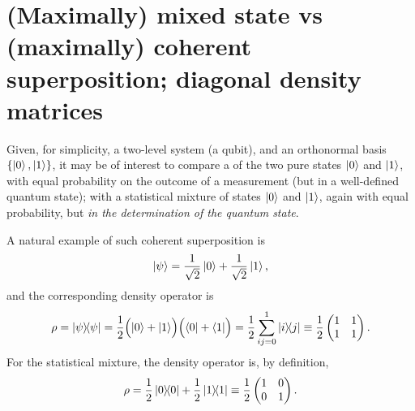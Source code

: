 \section{(Maximally) mixed state vs (maximally) coherent superposition; diagonal density matrices}
\label{sec:mix}

Given, for simplicity, a two-level system (a qubit), and an orthonormal basis
$\left\{\ket{0}, \ket{1}\right\}$, it may be of interest to compare a 
of the two pure states $\ket{0}$ and $\ket{1}$, with equal probability on the outcome of
a measurement (but in a well-defined quantum state); with a statistical mixture of
states $\ket{0}$ and $\ket{1}$, again with equal probability, but 
\emph{in the determination of the quantum state}.

A natural example of such coherent superposition is \parencite[Example 2.4]{Nakahara}
\[
  \ket{\psi} = \frac{1}{\sqrt{2}}\ket{0} + \frac{1}{\sqrt{2}}\ket{1}\text{,}
\]
and the corresponding density operator is
\begin{equation}\label{eq:matrix:pure}
  \rho = \ketbra{\psi}{\psi} =
  \frac{1}{2}\qty\Big(\ket{0} + \ket{1}) \qty\Big(\bra{0} + \bra{1}) =
  \frac{1}{2}\sum_{ij=0}^1\ketbra{i}{j} \equiv
  \frac{1}{2}
    \begin{pmatrix}
      1 &1  \\
      1 &1  \\
    \end{pmatrix}
  \text{.}
\end{equation}
For the statistical mixture, the density operator is, by definition,
\begin{equation}\label{eq:matrix:mix}
  \rho = \frac{1}{2}\ketbra{0}{0} + \frac{1}{2}\ketbra{1}{1} \equiv
  \frac{1}{2}
    \begin{pmatrix}
      1 &0  \\
      0 &1  \\
    \end{pmatrix}
  \text{.}
\end{equation}

